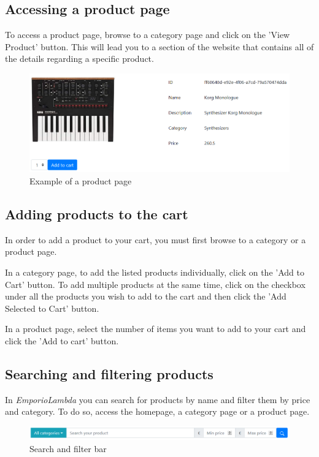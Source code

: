 \subsection{Accessing a product page}
To access a product page, browse to a category page and click on the 'View Product' button. This will lead you to a section of the website that contains all of the details regarding a specific product. 

\begin{figure}[H]
\centering
\includegraphics[scale=0.6]{res/Immagini/ProductPage}
\caption{Example of a product page}
\end{figure}

\subsection{Adding products to the cart}
In order to add a product to your cart, you must first browse to a category or a product page.

In a category page, to add the listed products individually, click on the 'Add to Cart' button. To add multiple products at the same time, click on the checkbox under all the products you wish to add to the cart and then click the 'Add Selected to Cart' button.

In a product page, select the number of items you want to add to your cart and click the 'Add to cart' button.

\subsection{Searching and filtering products}
In \textit{EmporioLambda} you can search for products by name and filter them by price and category. To do so, access the homepage, a category page or a product page.

\begin{figure}[H]
\centering
\includegraphics[scale=0.6]{res/Immagini/SearchFilterBar}
\caption{Search and filter bar}
\end{figure}

